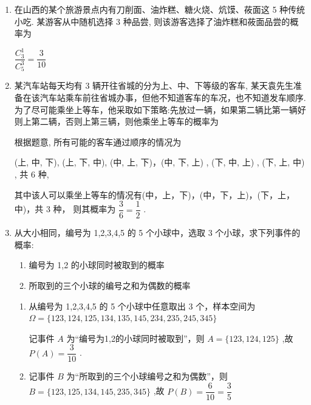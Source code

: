 \begin{enumerate}
\begin{enumerate}
        \item 在山西的某个旅游景点内有刀削面、油炸糕、糖火烧、炕馍、莜面这 5 种传统小吃. 某游客从中随机选择 3 种品尝, 则该游客选择了油炸糕和莜面品尝的概率为
        \begin{jieda}
            $\dfrac{C_3^1}{C_5^3} = \dfrac{3}{10}$
        \end{jieda}
        
        \item 某汽车站每天均有 3 辆开往省城的分为上、中、下等级的客车, 某天袁先生准备在该汽车站乘车前往省城办事，但他不知道客车的车况，也不知道发车顺序. 为了尽可能乘坐上等车，他采取如下策略:先放过一辆，如果第二辆比第一辆好则上第二辆，否则上第三辆，则他乘坐上等车的概率为
        \begin{jieda}
            根据题意, 所有可能的客车通过顺序的情况为

            (上, 中, 下), (上, 下, 中), (中, 上, 下)，(中, 下, 上) , (下, 中, 上) , (下, 上, 中) , 共 6 种,
            
            其中该人可以乘坐上等车的情况有(中，上，下)，(中，下，上)，(下，上，中)，共 3 种， 则其概率为 $\dfrac{3}{6} = \dfrac{1}{2}$ .
        \end{jieda}
        \item 从大小相同，编号为 1,2,3,4,5 的 5 个小球中，选取 3 个小球，求下列事件的概率:
        \begin{enumerate}
            \item 编号为 1,2 的小球同时被取到的概率
            \item 所取到的三个小球的编号之和为偶数的概率
        \end{enumerate}
        \begin{jieda}
            \begin{enumerate}
                \item 从编号为 1,2,3,4,5 的 5 个小球中任意取出 3 个，样本空间为 $\Omega  = \{ {123},{124},{125},{134},{135},{145},{234},{235},{245},{345}\}$

                记事件 $A$ 为“编号为1,2的小球同时被取到”，则 $A = \{ {123},{124},{125}\}$ ,故 $P\left( A\right)  = \dfrac{3}{10}$ .

                \item 记事件 $B$ 为“所取到的三个小球编号之和为偶数”，则 $B = \{ {123},{125},{134},{145},{235},{345}\}$ ,故 $P\left( B\right)  = \dfrac{6}{10} = \dfrac{3}{5}$
            \end{enumerate}
        \end{jieda}
        

\end{enumerate}
\end{enumerate}
